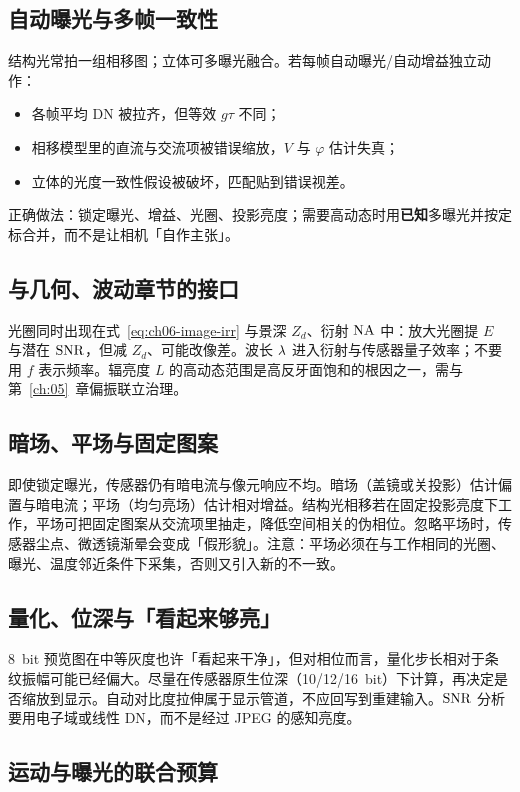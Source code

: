 \subsection{自动曝光与多帧一致性}

结构光常拍一组相移图；立体可多曝光融合。若每帧自动曝光/自动增益独立动作：
\begin{itemize}
  \item 各帧平均 DN 被拉齐，但等效 $g\tau$ 不同；
  \item 相移模型里的直流与交流项被错误缩放，$V$ 与 $\varphi$ 估计失真；
  \item 立体的光度一致性假设被破坏，匹配贴到错误视差。
\end{itemize}
正确做法：锁定曝光、增益、光圈、投影亮度；需要高动态时用\textbf{已知}多曝光并按定标合并，而不是让相机「自作主张」。

\subsection{与几何、波动章节的接口}

光圈同时出现在式~\eqref{eq:ch06-image-irr} 与景深 $Z_d$、衍射 $\mathrm{NA}$ 中：放大光圈提 $E$ 与潜在 $\mathrm{SNR}$，但减 $Z_d$、可能改像差。波长 $\lambda$ 进入衍射与传感器量子效率；不要用 $f$ 表示频率。辐亮度 $L$ 的高动态范围是高反牙面饱和的根因之一，需与第~\ref{ch:05}~章偏振联立治理。


\subsection{暗场、平场与固定图案}

即使锁定曝光，传感器仍有暗电流与像元响应不均。暗场（盖镜或关投影）估计偏置与暗电流；平场（均匀亮场）估计相对增益。结构光相移若在固定投影亮度下工作，平场可把固定图案从交流项里抽走，降低空间相关的伪相位。忽略平场时，传感器尘点、微透镜渐晕会变成「假形貌」。注意：平场必须在与工作相同的光圈、曝光、温度邻近条件下采集，否则又引入新的不一致。

\subsection{量化、位深与「看起来够亮」}

8~bit 预览图在中等灰度也许「看起来干净」，但对相位而言，量化步长相对于条纹振幅可能已经偏大。尽量在传感器原生位深（10/12/16~bit）下计算，再决定是否缩放到显示。自动对比度拉伸属于显示管道，不应回写到重建输入。$\mathrm{SNR}$ 分析要用电子域或线性 DN，而不是经过 JPEG 的感知亮度。

\subsection{运动与曝光的联合预算}

